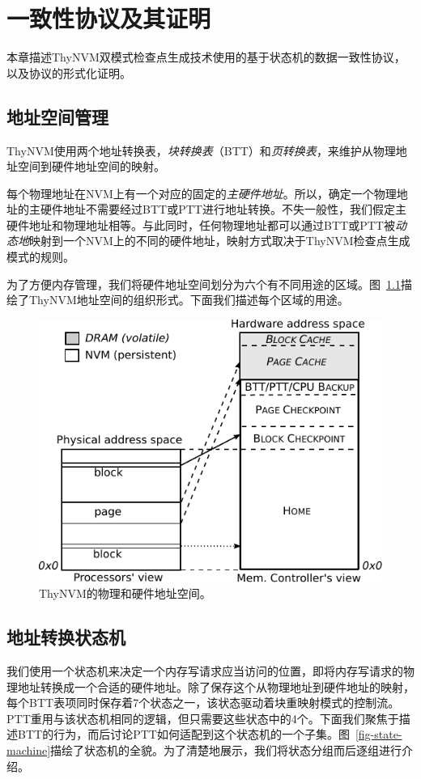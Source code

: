\chapter{一致性协议及其证明}
\label{chap:protocol}

本章描述ThyNVM双模式检查点生成技术使用的基于状态机的数据一致性协议，以及协议的形式化证明。

\section{地址空间管理}

ThyNVM使用两个地址转换表，\emph{块转换表}（BTT）和\emph{页转换表}，来维护从物理地址空间到硬件地址空间的映射。

每个物理地址在NVM上有一个对应的固定的\emph{主硬件地址}。所以，确定一个物理地址的主硬件地址不需要经过BTT或PTT进行地址转换。不失一般性，我们假定主硬件地址和物理地址相等。与此同时，任何物理地址都可以通过BTT或PTT被\emph{动态地}映射到一个NVM上的不同的硬件地址，映射方式取决于ThyNVM检查点生成模式的规则。

为了方便内存管理，我们将硬件地址空间划分为六个有不同用途的区域。图~\ref{fig-addr-space}描绘了ThyNVM地址空间的组织形式。下面我们描述每个区域的用途。

\begin{figure}[!h]
\centering
\includegraphics[width=0.6\linewidth]{figures/addr-space.pdf}
\caption{ThyNVM的物理和硬件地址空间。}
\label{fig-addr-space}
\end{figure}

\section{地址转换状态机}

我们使用一个状态机来决定一个内存写请求应当访问的位置，即将内存写请求的物理地址转换成一个合适的硬件地址。除了保存这个从物理地址到硬件地址的映射，每个BTT表项同时保存着7个状态之一，该状态驱动着块重映射模式的控制流。PTT重用与该状态机相同的逻辑，但只需要这些状态中的4个。下面我们聚焦于描述BTT的行为，而后讨论PTT如何适配到这个状态机的一个子集。图~\ref{fig-state-machine}描绘了状态机的全貌。为了清楚地展示，我们将状态分组而后逐组进行介绍。

